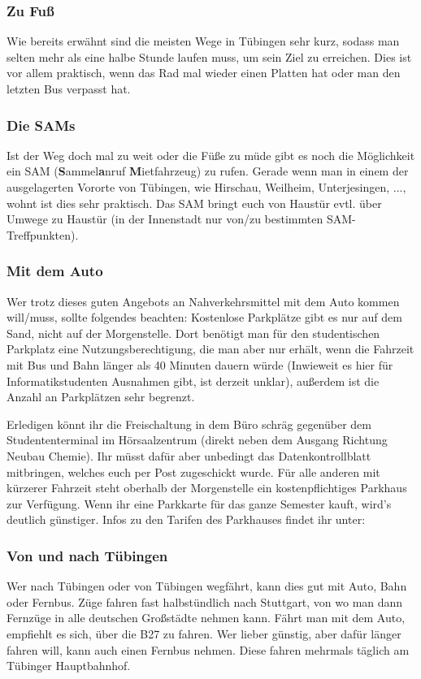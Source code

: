 \subsubsection*{Zu Fuß}
Wie bereits erwähnt sind die meisten Wege in Tübingen sehr kurz, sodass man selten mehr als eine halbe Stunde laufen muss, um sein Ziel zu erreichen. Dies ist vor allem praktisch, wenn das Rad mal wieder einen Platten hat oder man den letzten Bus verpasst hat.

\subsubsection*{Die SAMs}
Ist der Weg doch mal zu weit oder die Füße zu müde gibt es noch die Möglichkeit ein SAM (\textbf{S}ammel\textbf{a}nruf
\textbf{M}ietfahrzeug) zu rufen. Gerade wenn man in einem der ausgelagerten Vororte von Tübingen, wie Hirschau,
Weilheim, Unterjesingen, ..., wohnt ist dies sehr praktisch. Das SAM bringt euch von Haustür evtl. über Umwege zu Haustür (in der Innenstadt nur von/zu bestimmten SAM-Treffpunkten).

\subsubsection*{Mit dem Auto}
Wer trotz dieses guten Angebots an Nahverkehrsmittel mit dem Auto kommen will/muss, sollte folgendes beachten: Kostenlose Parkplätze gibt es nur auf dem Sand, nicht auf der Morgenstelle.  Dort benötigt man für den studentischen Parkplatz eine Nutzungsberechtigung, die man aber nur erhält, wenn die Fahrzeit mit Bus und Bahn länger als 40 Minuten dauern würde (Inwieweit es hier für Informatikstudenten Ausnahmen gibt, ist derzeit unklar), außerdem ist die Anzahl an Parkplätzen sehr begrenzt.

 Erledigen könnt ihr die Freischaltung in dem Büro schräg gegenüber dem Studententerminal im Hörsaalzentrum (direkt neben dem Ausgang Richtung Neubau Chemie). Ihr müsst dafür aber unbedingt das Datenkontrollblatt mitbringen, welches euch per Post zugeschickt wurde. Für alle anderen mit kürzerer Fahrzeit steht oberhalb der Morgenstelle ein kostenpflichtiges Parkhaus zur Verfügung. Wenn ihr eine Parkkarte für das ganze Semester kauft, wird's deutlich günstiger. Infos zu den Tarifen des Parkhauses findet ihr unter:



\subsubsection*{Von und nach Tübingen}
Wer nach Tübingen oder von Tübingen wegfährt, kann dies gut mit Auto, Bahn oder Fernbus. Züge fahren fast halbstündlich nach Stuttgart, von wo man dann Fernzüge in alle deutschen Großstädte nehmen kann. Fährt man mit dem Auto, empfiehlt es sich, über die B27 zu fahren. Wer lieber günstig, aber dafür länger fahren will, kann auch einen Fernbus nehmen. Diese fahren mehrmals täglich am Tübinger Hauptbahnhof.
